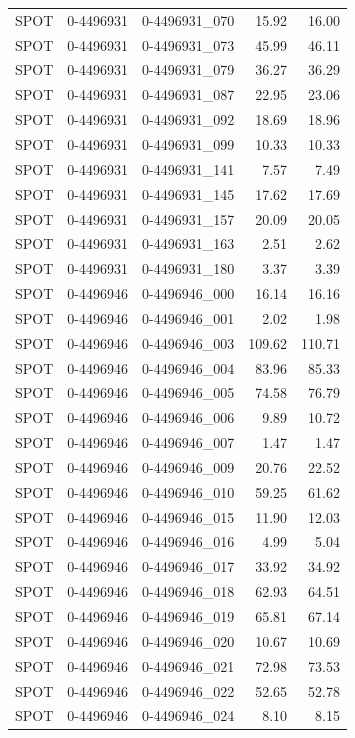 \begin{tabular}{lllrr}
SPOT & 0-4496931 & 0-4496931_070 & 15.92 & 16.00 \\
SPOT & 0-4496931 & 0-4496931_073 & 45.99 & 46.11 \\
SPOT & 0-4496931 & 0-4496931_079 & 36.27 & 36.29 \\
SPOT & 0-4496931 & 0-4496931_087 & 22.95 & 23.06 \\
SPOT & 0-4496931 & 0-4496931_092 & 18.69 & 18.96 \\
SPOT & 0-4496931 & 0-4496931_099 & 10.33 & 10.33 \\
SPOT & 0-4496931 & 0-4496931_141 & 7.57 & 7.49 \\
SPOT & 0-4496931 & 0-4496931_145 & 17.62 & 17.69 \\
SPOT & 0-4496931 & 0-4496931_157 & 20.09 & 20.05 \\
SPOT & 0-4496931 & 0-4496931_163 & 2.51 & 2.62 \\
SPOT & 0-4496931 & 0-4496931_180 & 3.37 & 3.39 \\
SPOT & 0-4496946 & 0-4496946_000 & 16.14 & 16.16 \\
SPOT & 0-4496946 & 0-4496946_001 & 2.02 & 1.98 \\
SPOT & 0-4496946 & 0-4496946_003 & 109.62 & 110.71 \\
SPOT & 0-4496946 & 0-4496946_004 & 83.96 & 85.33 \\
SPOT & 0-4496946 & 0-4496946_005 & 74.58 & 76.79 \\
SPOT & 0-4496946 & 0-4496946_006 & 9.89 & 10.72 \\
SPOT & 0-4496946 & 0-4496946_007 & 1.47 & 1.47 \\
SPOT & 0-4496946 & 0-4496946_009 & 20.76 & 22.52 \\
SPOT & 0-4496946 & 0-4496946_010 & 59.25 & 61.62 \\
SPOT & 0-4496946 & 0-4496946_015 & 11.90 & 12.03 \\
SPOT & 0-4496946 & 0-4496946_016 & 4.99 & 5.04 \\
SPOT & 0-4496946 & 0-4496946_017 & 33.92 & 34.92 \\
SPOT & 0-4496946 & 0-4496946_018 & 62.93 & 64.51 \\
SPOT & 0-4496946 & 0-4496946_019 & 65.81 & 67.14 \\
SPOT & 0-4496946 & 0-4496946_020 & 10.67 & 10.69 \\
SPOT & 0-4496946 & 0-4496946_021 & 72.98 & 73.53 \\
SPOT & 0-4496946 & 0-4496946_022 & 52.65 & 52.78 \\
SPOT & 0-4496946 & 0-4496946_024 & 8.10 & 8.15 \\

\end{tabular}
